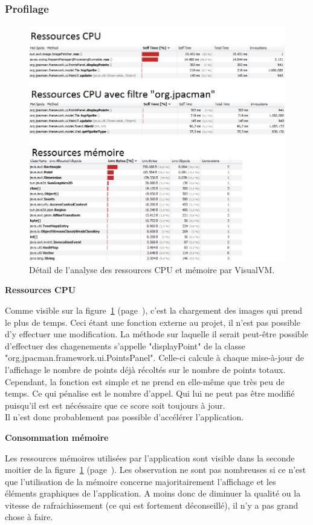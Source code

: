 \documentclass[12pt,a4paper,final]{article}
\newcommand{\smalltitle}[1]{\bigskip\large\textbf{#1}\par\normalsize\medskip}
\newcommand{\labelfigure}[1]{figure~\ref{#1} (page~\pageref{#1})}
\begin{document}
\subsubsection{Profilage}
\begin{figure}[!h]
	\centering
	\includegraphics{Profilage.png}
	\caption{\label{profilage}Détail de l'analyse des ressources CPU et mémoire par VisualVM.}
\end{figure}
\smalltitle{Ressources CPU}
Comme visible sur la \labelfigure{profilage}, c'est la chargement des images qui prend le plus de temps. Ceci étant une fonction externe au projet, il n'est pas possible d'y effectuer une modification. La méthode sur laquelle il serait peut-être possible d'effectuer des chagenements s'appelle "displayPoint" de la classe "org.jpacman.framework.ui.PointsPanel". Celle-ci calcule à chaque mise-à-jour de l'affichage le nombre de points déjà récoltés sur le nombre de points totaux. Cependant, la fonction est simple et ne prend en elle-même que très peu de temps. Ce qui pénalise est le nombre d'appel. Qui lui ne peut pas être modifié puisqu'il est est nécéssaire que ce score soit toujours à jour. \\
Il n'est donc probablement pas possible d'accélérer l'application.

\smalltitle{Consommation mémoire}
Les ressources mémoires utilisées par l'application sont visible dans la seconde moitier de la \labelfigure{profilage}. Les observation ne sont pas nombreuses si ce n'est que l'utilisation de la mémoire concerne majoritairement l'affichage et les éléments graphiques de l'application. A moins donc de diminuer la qualité ou la vitesse de rafraichissement (ce qui est fortement déconseillé), il n'y a pas grand chose à faire.
\end{document}
